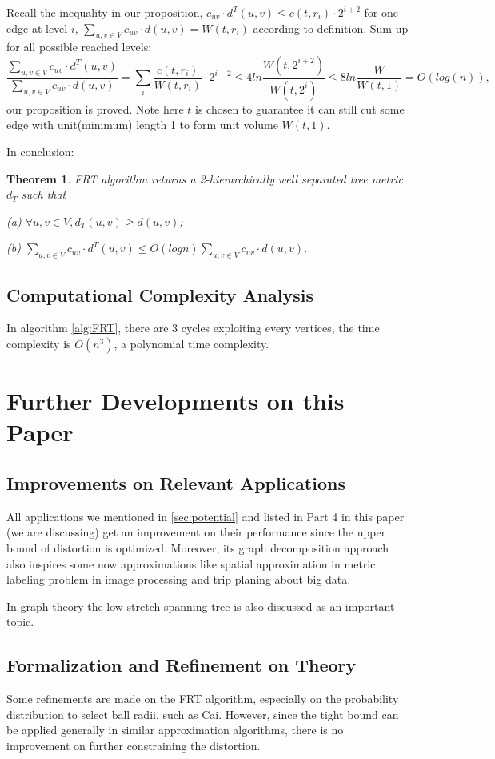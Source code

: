 \documentclass[11pt,twoside, onecolumn]{IEEEtran}
\newtheorem{Theorem}{Theorem}[section]
\begin{document}
Recall the inequality in our proposition, $c_{uv}\cdot d^T(u,v) \leq c(t,r_i)\cdot 2^{i+2}$ for one edge at level $i$, 
$\sum_{u,v\in V}c_{uv}\cdot d(u,v) = W(t,r_i)$ according to definition. Sum up for all possible reached levels:
$$\frac{\sum_{u,v\in V}c_{uv}\cdot d^T(u,v)}{\sum_{u,v\in V}c_{uv}\cdot d(u,v)}=\sum_i\frac{c(t,r_i)}{W(t,r_i)}\cdot 2^{i+2} \leq 4ln\frac{W(t,2^{i+2})}{W(t,2^i)} \leq 8ln\frac{W}{W(t,1)} = O(log(n)),$$
our proposition is proved. Note here $t$ is chosen to guarantee it can still cut some edge with unit(minimum)
length 1 to form unit volume $W(t,1)$.

In conclusion:
\begin{Theorem}
FRT algorithm returns a 2-hierarchically well separated tree metric $d_T$ such that\par
(a) $\forall u,v \in V, d_T(u,v)\geq d(u,v)$;\par
(b) $\sum_{u,v\in V}c_{uv}\cdot d^T(u,v)\leq O(logn)\sum_{u,v\in V}c_{uv}\cdot d(u,v)$.
\end{Theorem}
\subsection{Computational Complexity Analysis}
In algorithm \ref{alg:FRT}, there are 3 cycles exploiting every vertices, the time complexity is 
$O(n^3)$, a polynomial time complexity.

\section{Further Developments on this Paper}
\subsection{Improvements on Relevant Applications}
\label{sec:app}
All applications we mentioned in \ref{sec:potential} and listed in Part 4 in this paper (we are discussing)
get an improvement on their performance since the upper bound of distortion is optimized. Moreover,
its graph decomposition approach also inspires some now approximations like spatial approximation in
metric labeling problem in image processing\cite{metriclabel} and trip planing about big data\cite{plan}.

In graph theory the low-stretch spanning tree is also discussed as an important topic\cite{lowspan}.
\subsection{Formalization and Refinement on Theory}
Some refinements are made on the FRT algorithm, especially on the probability distribution to select 
ball radii, such as Cai\cite{RMOP}. However, since the tight bound can be applied generally in
similar approximation algorithms, there is no improvement on further constraining the distortion.
\end{document}
